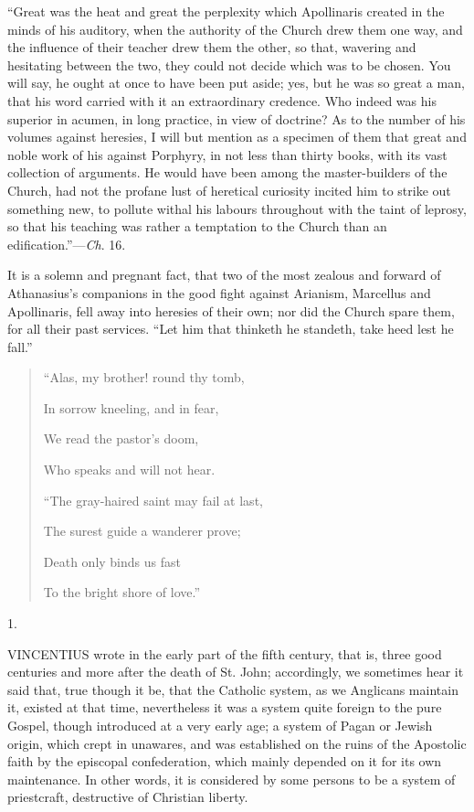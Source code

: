 ``Great was the heat and great the perplexity which Apollinaris
created in the minds of his auditory, when the authority of the Church
drew them one way, and the influence of their teacher drew them the
other, so that, wavering and hesitating between the two, they could
not decide which was to be chosen. You will say, he ought at once to
have been put aside; yes, but he was so great a man, that his word
carried with it an extraordinary credence. Who indeed was his superior
in acumen, in long practice, in view of doctrine? As to the number of
his volumes against heresies, I will but mention as a specimen of them
that great and noble work of his against Porphyry, in not less than
thirty books, with its vast collection of arguments. He would have
been among the master-builders of the Church, had not the profane lust
of heretical curiosity incited him to strike out something new, to
pollute withal his labours throughout with the taint of leprosy, so
that his teaching was rather a temptation to the Church than an
edification.''—\emph{Ch}. 16.

It is a solemn and pregnant fact, that two of the most zealous and
forward of Athanasius's companions in the good fight against Arianism,
Marcellus and Apollinaris, fell away into heresies of their own; nor
did the Church spare them, for all their past services. ``Let him
that thinketh he standeth, take heed lest he fall.''

\begin{quote}

``Alas, my brother! round thy tomb,

In sorrow kneeling, and in fear,

We read the pastor's doom,

Who speaks and will not hear.

``The gray-haired saint may fail at last,

The surest guide a wanderer prove;

Death only binds us fast

To the bright shore of love.''

\end{quote}


1.

VINCENTIUS wrote in the early part of
the fifth century, that is, three good centuries and more after the
death of St. John; accordingly, we sometimes hear it said that, true
though it be, that the Catholic system, as we Anglicans maintain it,
existed at that time, nevertheless it was a system quite foreign to
the pure Gospel, though introduced at a very early age; a system of
Pagan or Jewish origin, which crept in unawares, and was established
on the ruins of the Apostolic faith by the episcopal confederation,
which mainly depended on it for its own maintenance. In other words,
it is considered by some persons to be a system of priestcraft,
destructive of Christian liberty.

